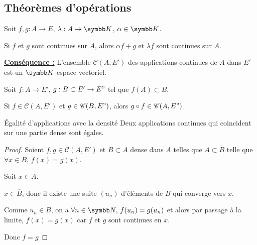 \subsection{Théorèmes d'opérations}

\begin{theoreme}{}{}
    Soit $f, g : A \to E$, $\lambda : A \to \K$, $\alpha \in \K$.

    Si $f$ et $g$ sont continues sur $A$, alors $\alpha f + g$ et $\lambda f$ sont 
    continues sur $A$. 
\end{theoreme}

\textbf{\uline{Conséquence :}}
L'ensemble $\mathscr C(A, E')$ des applications continues de $A$ dans $E'$ est un $\K$-espace vectoriel.

\begin{theoreme}{}{}
    Soit $f : A \to E'$, $g : B \subset E' \to E"$ tel que $f(A) \subset B$.

    Si $f \in \mathscr C(A, E')$ et $g \in \mathscr C(B, E")$, alors 
    $g \circ f \in \mathscr C(A, E")$.
\end{theoreme}

\begin{theoreme}{Égalité d'applications avec la densité}{}
    Deux applications continues qui coincident sur une partie dense sont égales. 
\end{theoreme}


\begin{proof}
    Soient $f, g \in \mathscr C(A, E')$ et $B \subset A$ dense dans $A$ telles que
    $A \subset \overline B$ telle que $\forall x \in B, \, f(x) = g(x)$.

    Soit $x \in A$. 

    $x \in \overline B$, donc il existe une suite $(u_n)$ d'éléments de $B$ qui converge vers $x$.
    
    Comme $u_n \in B$, on a $\forall n \in \N, \, f(u_n) = g(u_n)$ et alors par 
    passage à la limite, $f(x) = g(x)$ car $f$ et $g$ sont continues en $x$.

    Donc $f = g$
\end{proof}

